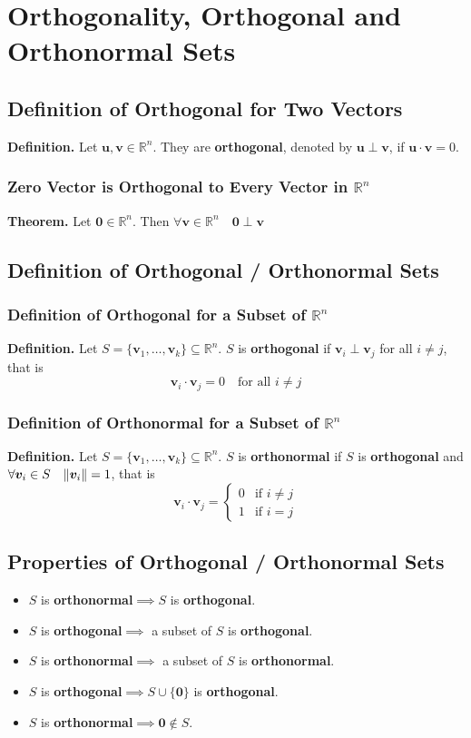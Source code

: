 \documentclass[../ma2001_notes.tex]{subfiles}
\begin{document}
\section{Orthogonality, Orthogonal and Orthonormal Sets}
\subsection{Definition of Orthogonal for Two Vectors}
\textbf{Definition.} Let \(\bm{u},\bm{v}\in\mathbb{R}^n\). They are \textbf{orthogonal}, denoted by \(\bm{u}\perp\bm{v}\), if \(\bm{u}\cdot\bm{v}=0\).

\subsubsection{Zero Vector is Orthogonal to Every Vector in $\mathbb{R}^n$}
\textbf{Theorem.} Let \(\bm{0}\in\mathbb{R}^n\). Then \(\forall\bm{v}\in\mathbb{R}^n\quad\bm{0}\perp\bm{v}\)

\subsection{Definition of Orthogonal / Orthonormal Sets}
\subsubsection{Definition of Orthogonal for a Subset of $\mathbb{R}^n$}
\textbf{Definition.} Let \(S=\{\bm{v}_1,\ldots,\bm{v}_k\}\subseteq\mathbb{R}^n\). \(S\) is \textbf{orthogonal} if \(\bm{v}_i\perp\bm{v}_j\) for all \(i\ne j\), that is
\[\bm{v}_i\cdot\bm{v}_j=0\quad\text{for all }i\ne j\]

\subsubsection{Definition of Orthonormal for a Subset of $\mathbb{R}^n$}
\textbf{Definition.} Let \(S=\{\bm{v}_1,\ldots,\bm{v}_k\}\subseteq\mathbb{R}^n\). \(S\) is \textbf{orthonormal} if \(S\) is \textbf{orthogonal} and \(\forall\bm{v}_i\in S\quad\lVert\bm{v}_i\rVert=1\), that is
\[\bm{v}_i\cdot\bm{v}_j=\begin{cases}
	0 & \text{if }i\ne j \\
	1 & \text{if }i=j
\end{cases}\]

\subsection{Properties of Orthogonal / Orthonormal Sets}
\begin{itemize}
	\item\(S\) is \textbf{orthonormal}\(\implies S\) is \textbf{orthogonal}.
	\item\(S\) is \textbf{orthogonal}\(\implies\) a subset of \(S\) is \textbf{orthogonal}.
	\item\(S\) is \textbf{orthonormal}\(\implies\) a subset of \(S\) is \textbf{orthonormal}.
	\item\(S\) is \textbf{orthogonal}\(\implies S\cup\{\bm{0}\}\) is \textbf{orthogonal}.
	\item\(S\) is \textbf{orthonormal}\(\implies\bm{0}\notin S\).
\end{itemize}
\end{document}

